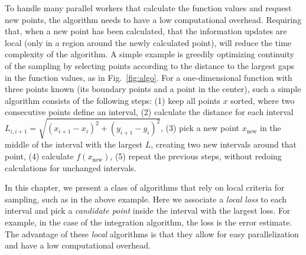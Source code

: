 
To handle many parallel workers that calculate the function values and request new points, the algorithm needs to have a low computational overhead.
Requiring that, when a new point has been calculated, that the information updates are local (only in a region around the newly calculated point), will reduce the time complexity of the algorithm.
A simple example is greedily optimizing continuity of the sampling by selecting points according to the distance to the largest gaps in the function values, as in Fig.~\ref{fig:algo}.
For a one-dimensional function with three points known (its boundary points and a point in the center), such a simple algorithm consists of the following steps:
(1) keep all points $x$ sorted, where two consecutive points define an interval,
(2) calculate the distance for each interval $L_{i, i+1}=\sqrt{(x_{i+1}-x_{i})^{2}+(y_{i+1}-y_{i})^{2}}$,
(3) pick a new point $x_\textrm{new}$ in the middle of the interval with the largest $L$, creating two new intervals around that point,
(4) calculate $f(x_\textrm{new})$,
(5) repeat the previous steps, without redoing calculations for unchanged intervals.

In this chapter, we present a class of algorithms that rely on local criteria for sampling, such as in the above example.
Here we associate a \emph{local loss} to each interval and pick a \emph{candidate point} inside the interval with the largest loss.
For example, in the case of the integration algorithm, the loss is the error estimate.
The advantage of these \emph{local} algorithms is that they allow for easy parallelization and have a low computational overhead.

